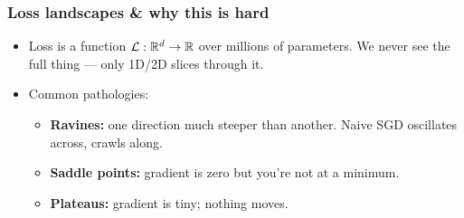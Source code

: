 \begin{frame}
\frametitle{Loss landscapes \& why this is hard}
\begin{itemize}
    \item Loss is a function $\mathcal{L} : \mathbb{R}^d \to \mathbb{R}$ over millions of
    parameters. We never see the full thing --- only 1D/2D slices through it.
    \pause
    \item Common pathologies:
    \begin{itemize}
        \item \textbf{Ravines:} one direction much steeper than another.
        Naive SGD oscillates across, crawls along.
        \pause
        \item \textbf{Saddle points:} gradient is zero but you're not at a
        minimum.
        \pause
        \item \textbf{Plateaus:} gradient is tiny; nothing moves.
    \end{itemize}
\end{itemize}
\begin{center}
\end{center}
\end{frame}

